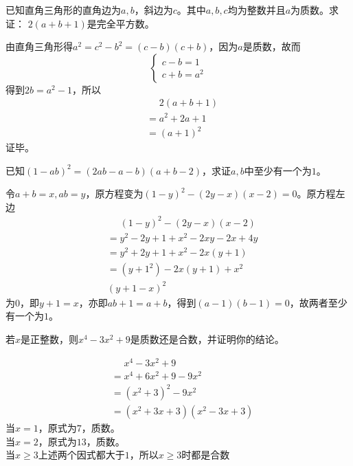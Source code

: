 \documentclass[windows,csize4,answers]{BHCexam}
\begin{document}
\begin{groups}
\begin{questions}[]
        \question[5] 已知直角三角形的直角边为$a,b$，斜边为$c$。其中$a,b,c$均为整数并且$a$为质数。求证：
        $2(a+b+1)$是完全平方数。
        \begin{solution}{0.5cm}
            \methodonly 由直角三角形得$a^2=c^2-b^2=(c-b)(c+b)$，因为$a$是质数，故而
            \[
                \begin{cases}
                    c-b=1 \\
                    c+b=a^2
                \end{cases}
            \]
            得到$2b=a^2-1$，所以
            \[
                \begin{aligned}
                    &\phantom{=}2(a+b+1) \\
                    &=a^2+2a+1 \\ 
                    &=(a+1)^2
                \end{aligned}
            \]
            证毕。
        \end{solution}
        \vspace{3.5cm}

        \question[5] 已知$(1-ab)^2=(2ab-a-b)(a+b-2)$，求证$a,b$中至少有一个为$1$。
        \begin{solution}{0.5cm}
            \methodonly 令$a+b=x, ab=y$，原方程变为$(1-y)^2-(2y-x)(x-2)=0$。原方程左边
            \[
                \begin{aligned}
                    &\phantom{=}(1-y)^2-(2y-x)(x-2) \\
                    &=y^2-2y+1+x^2-2xy-2x+4y \\ 
                    &=y^2+2y+1+x^2-2x(y+1) \\ 
                    &=(y+1^2)-2x(y+1)+x^2 \\ 
                    &(y+1-x)^2
                \end{aligned}
            \]
            为$0$，即$y+1=x$，亦即$ab+1=a+b$，得到$(a-1)(b-1)=0$，故两者至少有一个为$1$。
        \end{solution}
        \vspace{3.5cm}

        \question[5] 若$x$是正整数，则$x^4-3x^2+9$是质数还是合数，并证明你的结论。
        \begin{solution}{0.5cm}
            \methodonly 
            \[
                \begin{aligned}
                    &\phantom{=}x^4-3x^2+9 \\
                    &=x^4+6x^2+9-9x^2 \\ 
                    &=(x^2+3)^2-9x^2 \\ 
                    &=(x^2+3x+3)(x^2-3x+3) 
                \end{aligned}
            \]
            当$x=1$，原式为$7$，质数。 \\ 
            当$x=2$，原式为$13$，质数。 \\ 
            当$x\ge 3$上述两个因式都大于$1$，所以$x\ge 3$时都是合数


\end{solution}
\end{questions}
\end{groups}
\end{document}
